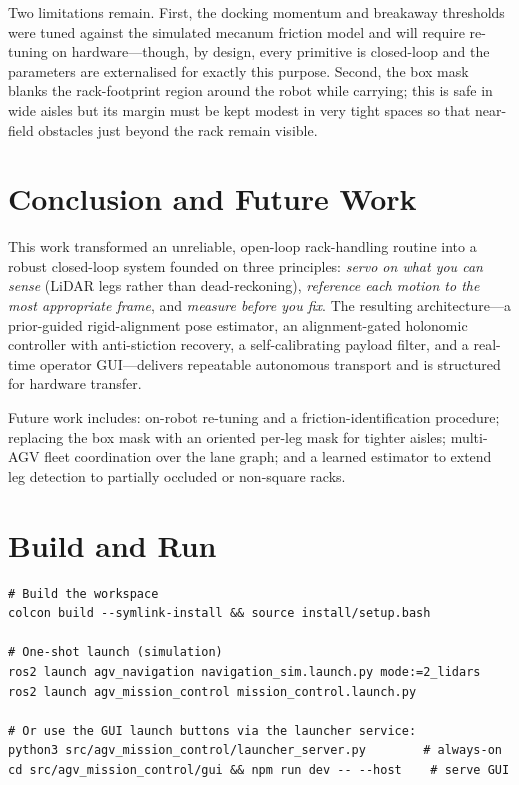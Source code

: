 \documentclass[11pt,a4paper]{article}
\begin{document}
Two limitations remain. First, the docking momentum and breakaway thresholds
were tuned against the simulated mecanum friction model and will require
re-tuning on hardware---though, by design, every primitive is closed-loop and
the parameters are externalised for exactly this purpose. Second, the box
mask blanks the rack-footprint region around the robot while carrying; this
is safe in wide aisles but its margin must be kept modest in very tight
spaces so that near-field obstacles just beyond the rack remain visible.

\section{Conclusion and Future Work}\label{sec:concl}
This work transformed an unreliable, open-loop rack-handling routine into a
robust closed-loop system founded on three principles: \emph{servo on what
you can sense} (LiDAR legs rather than dead-reckoning), \emph{reference each
motion to the most appropriate frame}, and \emph{measure before you fix}. The
resulting architecture---a prior-guided rigid-alignment pose estimator, an
alignment-gated holonomic controller with anti-stiction recovery, a
self-calibrating payload filter, and a real-time operator GUI---delivers
repeatable autonomous transport and is structured for hardware transfer.

Future work includes: on-robot re-tuning and a friction-identification
procedure; replacing the box mask with an oriented per-leg mask for tighter
aisles; multi-AGV fleet coordination over the lane graph; and a learned
estimator to extend leg detection to partially occluded or non-square racks.

\appendix
\section{Build and Run}
\begin{lstlisting}[language={},numbers=none,basicstyle=\ttfamily\scriptsize]
# Build the workspace
colcon build --symlink-install && source install/setup.bash

# One-shot launch (simulation)
ros2 launch agv_navigation navigation_sim.launch.py mode:=2_lidars
ros2 launch agv_mission_control mission_control.launch.py

# Or use the GUI launch buttons via the launcher service:
python3 src/agv_mission_control/launcher_server.py        # always-on
cd src/agv_mission_control/gui && npm run dev -- --host    # serve GUI
\end{lstlisting}
\end{document}
